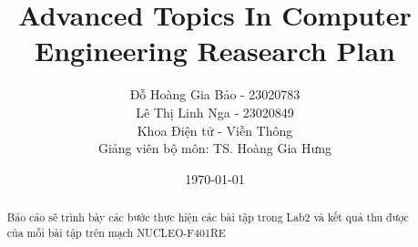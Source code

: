 \documentclass[12pt, letterpaper]{article}
\title{Advanced Topics In Computer Engineering Reasearch Plan}
\author{Đỗ Hoàng Gia Bảo - 23020783 \\ Lê Thị Linh Nga - 23020849 \\ \small Khoa Điện tử - Viễn Thông \\ Giảng viên bộ môn: TS. Hoàng Gia Hưng}
\date{\today}
\begin{document}
\maketitle

\begin{abstract}
Báo cáo sẽ trình bày các bước thực hiện các bài tập trong Lab2 và kết quả thu được của mỗi bài tập trên mạch NUCLEO-F401RE
\end{abstract}
\newpage
\tableofcontents

\newpage
{}
\setcounter{page}{3} %
\end{document}
